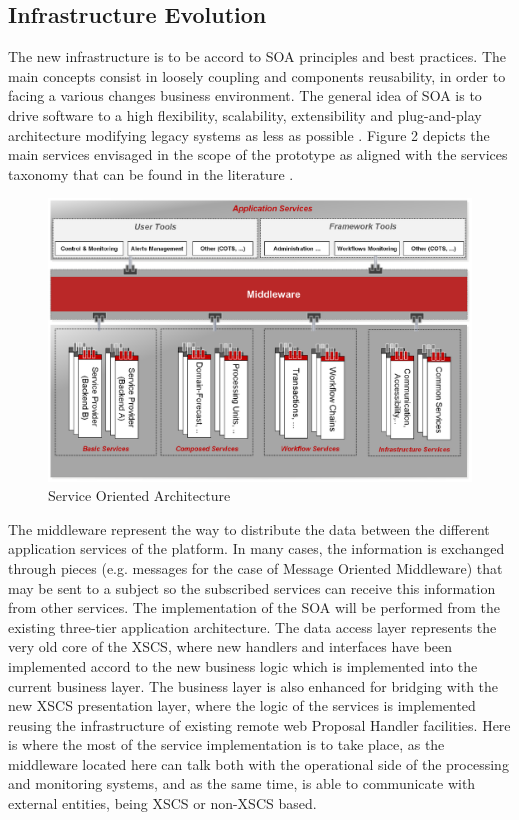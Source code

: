 \documentclass[11pt,twoside]{article}
\begin{document}
\subsection{Infrastructure Evolution}
The new infrastructure is to be accord to SOA principles and best practices. The main concepts consist in loosely coupling and components reusability, in order to facing a various changes business environment.  
The general idea of SOA is to drive software to a high flexibility, scalability, extensibility and plug-and-play architecture modifying legacy systems as less as possible \cite{soa1}.
Figure 2 depicts the main services envisaged in the scope of the prototype as aligned with the services taxonomy that can be found in the literature \cite{soa2}.
\begin{figure}[h]
\centering
\includegraphics[width=80 mm]{P022_f2.eps}
\caption{Service Oriented Architecture}
\label{fig2}
\end{figure}
The middleware represent the way to distribute the data between the different application services of the platform. In many cases, the information is exchanged through pieces (e.g. messages for the case of Message Oriented Middleware) that may be sent to a subject so the subscribed services can receive this information from other services. The implementation of the SOA will be performed from the existing three-tier application architecture. The data access layer represents the very old core of the XSCS, where new handlers and interfaces have been implemented accord to the new business logic which is implemented into the current business layer. The business layer is also enhanced for bridging with the new XSCS presentation layer, where the logic of the services is implemented reusing the infrastructure of existing remote web Proposal Handler facilities. Here is where the most of the service implementation is to take place, as the middleware located here can talk both with the operational side of the processing and monitoring systems, and as the same time, is able to communicate with external entities, being XSCS or non-XSCS based.
\end{document}
